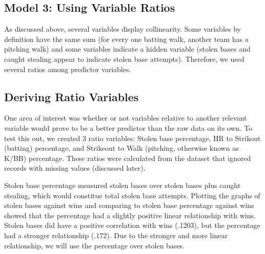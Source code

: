 \documentclass[]{article}
\begin{document}
\subsection{Model 3: Using Variable
Ratios}\label{model-3-using-variable-ratios}

As discussed above, several variables display collinearity. Some
variables by definition have the same sum (for every one batting walk,
another team has a pitching walk) and some variables indicate a hidden
variable (stolen bases and caught stealing appear to indicate stolen
base attempts). Therefore, we used several ratios among predictor
variables.

\subsection{Deriving Ratio Variables}\label{deriving-ratio-variables}

One area of interest was whether or not variables relative to another
relevant variable would prove to be a better predictor than the raw data
on its own. To test this out, we created 3 ratio variables: Stolen base
percentage, HR to Strikout (batting) percentage, and Strikeout to Walk
(pitching, otherwise known as K/BB) percentage. These ratios were
calculated from the dataset that ignored records with missing values
(discussed later).

Stolen base percentage measured stolen bases over stolen bases plus
caught stealing, which would constitue total stolen base attempts.
Plotting the graphs of stolen bases against wins and comparing to stolen
base percentage against wins showed that the percentage had a slightly
positive linear relationship with wins. Stolen bases did have a positive
correlation with wins (.1203), but the percentage had a stronger
relationship (.172). Due to the stronger and more linear relationship,
we will use the percentage over stolen bases.
\end{document}
